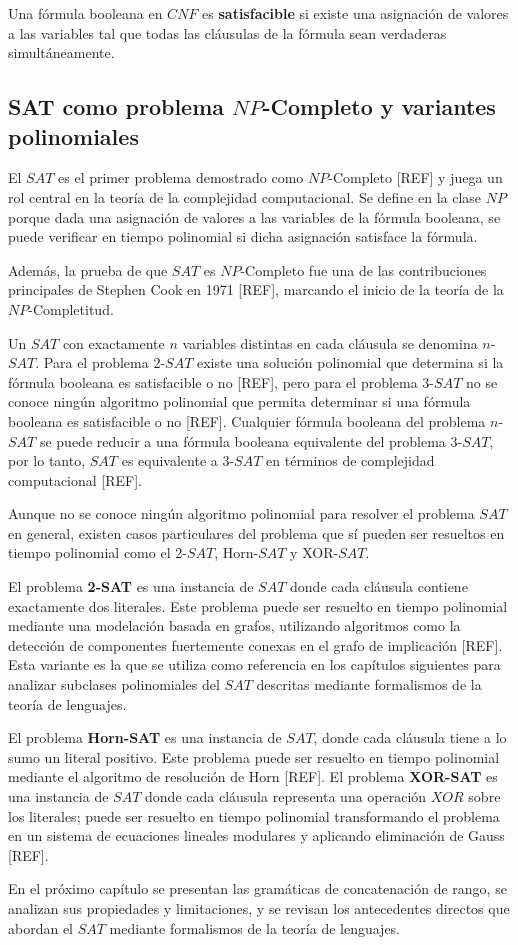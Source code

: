 \documentclass{report}
\theoremstyle{definition}
\theoremstyle{plain}
\theoremstyle{remark}
\begin{document}
Una fórmula booleana en $CNF$ es \textbf{satisfacible} si existe una
asignación de valores a las variables tal que todas las cláusulas de la
fórmula sean verdaderas simultáneamente.

\subsection{SAT como problema $NP$-Completo y variantes polinomiales}
\label{sec:sat-variantes}

El $SAT$ es el primer problema demostrado como $NP$-Completo
[REF] y juega un rol central en la teoría de la complejidad
computacional. Se define en la clase $NP$ porque dada una asignación de
valores a las variables de la fórmula booleana, se puede verificar en
tiempo polinomial si dicha asignación satisface la fórmula.

Además, la prueba de que $SAT$ es $NP$-Completo fue una de las
contribuciones principales de Stephen Cook en 1971 [REF],
marcando el inicio de la teoría de la $NP$-Completitud.

Un $SAT$ con exactamente $n$ variables distintas en cada cláusula se
denomina $n$-$SAT$. Para el problema 2-$SAT$ existe una solución
polinomial que determina si la fórmula booleana es satisfacible o no
[REF], pero para el problema 3-$SAT$ no se conoce ningún
algoritmo polinomial que permita determinar si una fórmula booleana es
satisfacible o no [REF]. Cualquier fórmula booleana del
problema $n$-$SAT$ se puede reducir a una fórmula booleana equivalente
del problema 3-$SAT$, por lo tanto, $SAT$ es equivalente a 3-$SAT$ en
términos de complejidad computacional [REF].

Aunque no se conoce ningún algoritmo polinomial para resolver el problema
$SAT$ en general, existen casos particulares del problema que sí pueden
ser resueltos en tiempo polinomial como el 2-$SAT$, Horn-$SAT$ y
XOR-$SAT$.

El problema \textbf{2-SAT} es una instancia de $SAT$ donde cada
cláusula contiene exactamente dos literales. Este problema puede ser
resuelto en tiempo polinomial mediante una modelación basada en grafos,
utilizando algoritmos como la detección de componentes fuertemente
conexas en el grafo de implicación [REF]. Esta variante es la
que se utiliza como referencia en los capítulos siguientes para analizar
subclases polinomiales del $SAT$ descritas mediante formalismos de la
teoría de lenguajes.

El problema \textbf{Horn-SAT} es una instancia de $SAT$, donde cada
cláusula tiene a lo sumo un literal positivo. Este problema puede ser
resuelto en tiempo polinomial mediante el algoritmo de resolución de
Horn [REF]. El problema \textbf{XOR-SAT} es una instancia
de $SAT$ donde cada cláusula representa una operación $XOR$ sobre los
literales; puede ser resuelto en tiempo polinomial transformando el
problema en un sistema de ecuaciones lineales modulares y aplicando
eliminación de Gauss [REF].

En el próximo capítulo se presentan las gramáticas de concatenación de
rango, se analizan sus propiedades y limitaciones, y se revisan los
antecedentes directos que abordan el $SAT$ mediante formalismos de la
teoría de lenguajes.
\end{document}
